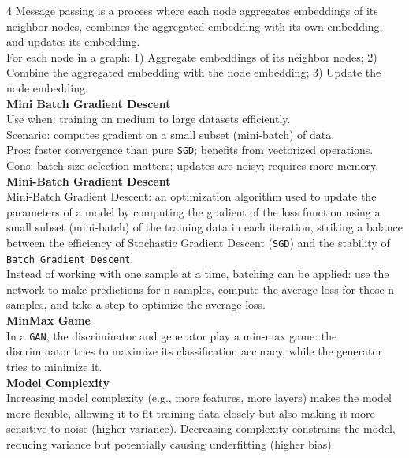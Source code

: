\documentclass[8pt]{extarticle}
\begin{document}
\begin{multicols}{4}
Message passing is a process where each node aggregates embeddings of its neighbor nodes, combines the aggregated embedding with its own embedding, and updates its embedding.\\
For each node in a graph: 1) Aggregate embeddings of its neighbor nodes; 2) Combine the aggregated embedding with the node embedding; 3) Update the node embedding.\\
\vspace{2pt}\textbf{Mini Batch Gradient Descent}\\
Use when: training on medium to large datasets efficiently.\\
Scenario: computes gradient on a small subset (mini-batch) of data.\\
Pros: faster convergence than pure \texttt{SGD}; benefits from vectorized operations.\\
Cons: batch size selection matters; updates are noisy; requires more memory.\\
\vspace{2pt}\textbf{Mini-Batch Gradient Descent}\\
Mini-Batch Gradient Descent: an optimization algorithm used to update the parameters of a model by computing the gradient of the loss function using a small subset (mini-batch) of the training data in each iteration, striking a balance between the efficiency of Stochastic Gradient Descent (\texttt{SGD}) and the stability of \texttt{Batch Gradient Descent}.\\
Instead of working with one sample at a time, batching can be applied: use the network to make predictions for n samples, compute the average loss for those n samples, and take a step to optimize the average loss.\\
\vspace{2pt}\textbf{MinMax Game}\\
In a \texttt{GAN}, the discriminator and generator play a min-max game: the discriminator tries to maximize its classification accuracy, while the generator tries to minimize it.\\
\vspace{2pt}\textbf{Model Complexity}\\
Increasing model complexity (e.g., more features, more layers) makes the model more flexible, allowing it to fit training data closely but also making it more sensitive to noise (higher variance). Decreasing complexity constrains the model, reducing variance but potentially causing underfitting (higher bias).\\

\end{multicols}
\end{document}
